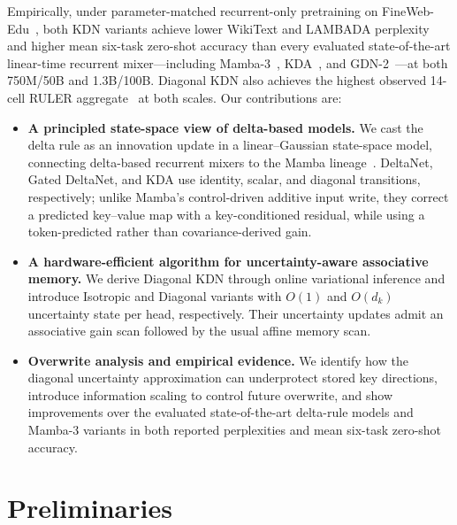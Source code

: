 \documentclass[11pt,letterpaper,logo]{yalearxiv}
\begin{document}
Empirically, under parameter-matched recurrent-only pretraining on
FineWeb-Edu~\citep{penedo2024fineweb}, both KDN variants achieve lower WikiText and LAMBADA
perplexity and higher mean six-task zero-shot accuracy than every evaluated state-of-the-art
linear-time recurrent mixer---including Mamba-3~\citep{lahoti2026mamba3},
KDA~\citep{kimiteam2025kimilinear}, and GDN-2~\citep{hatamizadeh2026gdn2}---at both 750M/50B
and 1.3B/100B. Diagonal KDN also achieves the highest observed 14-cell RULER
aggregate~\citep{hsieh2024ruler} at both scales. Our contributions are:

\begin{itemize}[leftmargin=1.4em,itemsep=3pt,topsep=2pt]
  \item \textbf{A principled state-space view of delta-based models.} We cast the delta rule as an
  innovation update in a linear--Gaussian state-space model, connecting delta-based recurrent
  mixers to the Mamba lineage~\citep{gu2023mamba}. DeltaNet, Gated DeltaNet, and KDA use
  identity, scalar, and diagonal transitions, respectively; unlike Mamba's control-driven additive
  input write, they correct a predicted key--value map with a key-conditioned residual, while using
  a token-predicted rather than covariance-derived gain.
  \item \textbf{A hardware-efficient algorithm for uncertainty-aware associative memory.} We derive Diagonal KDN through online
  variational inference and introduce Isotropic and Diagonal variants with $O(1)$ and $O(d_k)$
  uncertainty state per head, respectively. Their uncertainty updates admit an associative gain
  scan followed by the usual affine memory scan.
  \item \textbf{Overwrite analysis and empirical evidence.} We identify how the diagonal
  uncertainty approximation can underprotect stored key directions, introduce information scaling to control future
  overwrite, and show improvements over the evaluated state-of-the-art delta-rule models and
  Mamba-3 variants in both reported perplexities and mean six-task zero-shot accuracy.
\end{itemize}


\section{Preliminaries}
\label{sec:preliminaries}
\end{document}
